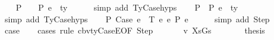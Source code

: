 \begin{isabellebody}
\ \ \isamarkupfalse%
\ P{}{\isacharcolon}{\kern0pt}\ {\isachardoublequoteopen}{\isasymGamma}{}{\isacharprime}{\kern0pt}\ {\isacharat}{\kern0pt}\ {\isasymGamma}\ {\isasymturnstile}{\isacharbraceleft}{\kern0pt}P{\isacharbraceright}{\kern0pt}\ e{}{\isacharprime}{\kern0pt}\ {\isacharcolon}{\kern0pt}\ ty{}{\isacharprime}{\kern0pt}{\isachardoublequoteclose}\isanewline
\ \ \ \ \isamarkupfalse%
\ {\isacharparenleft}{\kern0pt}simp\ add{\isacharcolon}{\kern0pt}\ TyCase{\isachardot}{\kern0pt}hyps{\isacharparenleft}{\kern0pt}{}{\isacharparenright}{\kern0pt}{\isacharparenright}{\kern0pt}\isanewline
\ \ \isamarkupfalse%
\ P{}{\isacharcolon}{\kern0pt}\ {\isachardoublequoteopen}{\isasymGamma}\ {\isasymturnstile}{\isacharbraceleft}{\kern0pt}P{\isacharbraceright}{\kern0pt}\ e{}{\isacharprime}{\kern0pt}\ {\isacharcolon}{\kern0pt}\ ty{}{\isacharprime}{\kern0pt}{\isachardoublequoteclose}\isanewline
\ \ \ \ \isamarkupfalse%
\ {\isacharparenleft}{\kern0pt}simp\ add{\isacharcolon}{\kern0pt}\ TyCase{\isachardot}{\kern0pt}hyps{\isacharparenleft}{\kern0pt}{}{\isacharparenright}{\kern0pt}{\isacharparenright}{\kern0pt}\isanewline
\ \ \isamarkupfalse%
\ P{}{\isacharcolon}{\kern0pt}\ {\isachardoublequoteopen}Case\ e{}{\isacharprime}{\kern0pt}\ {\isasymGamma}{}{\isacharprime}{\kern0pt}\ T\ e{}{\isacharprime}{\kern0pt}\ e{}{\isacharprime}{\kern0pt}\ {\isacharminus}{\kern0pt}{\isachargreater}{\kern0pt}{\isacharbraceleft}{\kern0pt}P{\isacharbraceright}{\kern0pt}\ e{\isacharprime}{\kern0pt}{\isachardoublequoteclose}\isanewline
\ \ \ \ \isamarkupfalse%
\ {\isacharparenleft}{\kern0pt}simp\ add{\isacharcolon}{\kern0pt}\ Step{\isacharparenright}{\kern0pt}\isanewline
\isanewline
\ \ \isamarkupfalse%
\ {\isacharquery}{\kern0pt}case\isanewline
\ \ \isamarkupfalse%
\ {\isacharparenleft}{\kern0pt}cases\ rule{\isacharcolon}{\kern0pt}\ cbv{\isacharunderscore}{\kern0pt}ty{\isacharunderscore}{\kern0pt}CaseE{\isacharbrackleft}{\kern0pt}OF\ Step{\isacharbrackright}{\kern0pt}{\isacharparenright}{\kern0pt}\isanewline
\ \ \ \ \isamarkupfalse%
\ {\isacharparenleft}{\kern0pt}{}\ v\ XsGs{\isacharparenright}{\kern0pt}\isanewline
\ \ \ \ \isamarkupfalse%
\ \isamarkupfalse%
\ {\isacharquery}{\kern0pt}thesis\isanewline
\ \ \ \ \ \ \isamarkupfalse%

\end{isabellebody}
